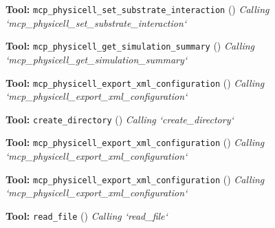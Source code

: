 \documentclass[11pt,a4paper]{article}
\begin{document}
\begin{toolokbox}
\textbf{Tool:} \texttt{mcp\_physicell\_set\_substrate\_interaction} (\checkmark)
\textit{Calling `mcp\_physicell\_set\_substrate\_interaction`}
\end{toolokbox}
\begin{toolokbox}
\textbf{Tool:} \texttt{mcp\_physicell\_get\_simulation\_summary} (\checkmark)
\textit{Calling `mcp\_physicell\_get\_simulation\_summary`}
\end{toolokbox}
\begin{toolokbox}
\textbf{Tool:} \texttt{mcp\_physicell\_export\_xml\_configuration} (\checkmark)
\textit{Calling `mcp\_physicell\_export\_xml\_configuration`}
\end{toolokbox}
\begin{toolokbox}
\textbf{Tool:} \texttt{create\_directory} (\checkmark)
\textit{Calling `create\_directory`}
\end{toolokbox}
\begin{toolokbox}
\textbf{Tool:} \texttt{mcp\_physicell\_export\_xml\_configuration} (\checkmark)
\textit{Calling `mcp\_physicell\_export\_xml\_configuration`}
\end{toolokbox}
\begin{toolokbox}
\textbf{Tool:} \texttt{mcp\_physicell\_export\_xml\_configuration} (\checkmark)
\textit{Calling `mcp\_physicell\_export\_xml\_configuration`}
\end{toolokbox}
\begin{toolokbox}
\textbf{Tool:} \texttt{read\_file} (\checkmark)
\textit{Calling `read\_file`}
\end{toolokbox}
\end{document}
